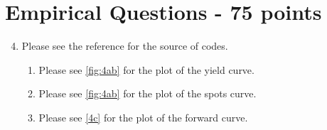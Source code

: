 \documentclass{article}
\begin{document}
\section*{Empirical Questions - 75 points} 

\begin{enumerate}
\setcounter{enumi}{3} 
    \item Please see the reference for the source of codes.
    \begin{enumerate}
        \item Please see \ref{fig:4ab} for the plot of the yield curve.
        \item Please see \ref{fig:4ab} for the plot of the spots curve.
         \item Please see \ref{4c} for the plot of the forward curve. 
         

\end{enumerate}
\end{enumerate}
\end{document}
